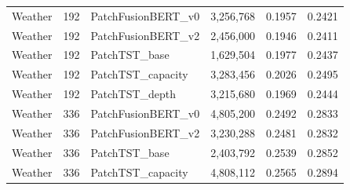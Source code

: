 \begin{tabular}{lllrcc}
Weather & 192 & PatchFusionBERT_v0 & 3,256,768 & 0.1957 & 0.2421 \\
Weather & 192 & PatchFusionBERT_v2 & 2,456,000 & 0.1946 & 0.2411 \\
Weather & 192 & PatchTST_base & 1,629,504 & 0.1977 & 0.2437 \\
Weather & 192 & PatchTST_capacity & 3,283,456 & 0.2026 & 0.2495 \\
Weather & 192 & PatchTST_depth & 3,215,680 & 0.1969 & 0.2444 \\
Weather & 336 & PatchFusionBERT_v0 & 4,805,200 & 0.2492 & 0.2833 \\
Weather & 336 & PatchFusionBERT_v2 & 3,230,288 & 0.2481 & 0.2832 \\
Weather & 336 & PatchTST_base & 2,403,792 & 0.2539 & 0.2852 \\
Weather & 336 & PatchTST_capacity & 4,808,112 & 0.2565 & 0.2894 \\
\bottomrule
\end{tabular}

